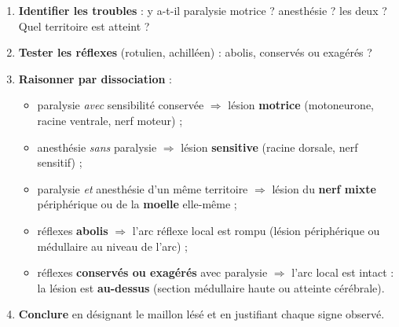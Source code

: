 \documentclass[11pt]{article}
\begin{document}
\begin{methode}
\begin{enumerate}
\item \textbf{Identifier les troubles} : y a-t-il paralysie motrice ? anesthésie ? les deux ? Quel territoire est atteint ?
\item \textbf{Tester les réflexes} (rotulien, achilléen) : abolis, conservés ou exagérés ?
\item \textbf{Raisonner par dissociation} :
\begin{itemize}
\item paralysie \emph{avec} sensibilité conservée $\Rightarrow$ lésion \textbf{motrice} (motoneurone, racine ventrale, nerf moteur) ;
\item anesthésie \emph{sans} paralysie $\Rightarrow$ lésion \textbf{sensitive} (racine dorsale, nerf sensitif) ;
\item paralysie \emph{et} anesthésie d'un même territoire $\Rightarrow$ lésion du \textbf{nerf mixte} périphérique ou de la \textbf{moelle} elle-même ;
\item réflexes \textbf{abolis} $\Rightarrow$ l'arc réflexe local est rompu (lésion périphérique ou médullaire au niveau de l'arc) ;
\item réflexes \textbf{conservés ou exagérés} avec paralysie $\Rightarrow$ l'arc local est intact : la lésion est \textbf{au-dessus} (section médullaire haute ou atteinte cérébrale).
\end{itemize}
\item \textbf{Conclure} en désignant le maillon lésé et en justifiant chaque signe observé.
\end{enumerate}
\end{methode}
\end{document}
